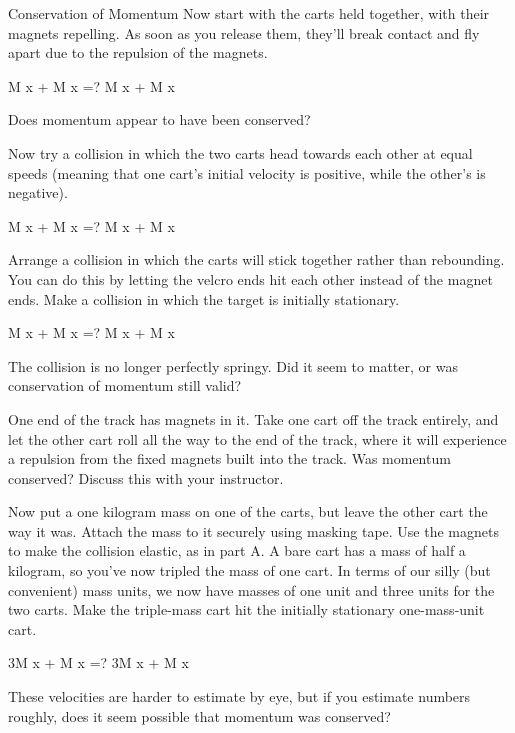 \begin{lab}{Conservation of Momentum}
Now start with the carts held together, with their magnets repelling. As soon as you release them, they'll break contact and fly apart due to the repulsion of the magnets.

        M x \fillinblank + M x \fillinblank =? M x \fillinblank + M x \fillinblank   

Does momentum appear to have been conserved?

Now try a collision in which the two carts head towards each other at equal speeds (meaning that one cart's initial velocity is positive, while the other's is negative).

        M x \fillinblank + M x \fillinblank =? M x \fillinblank + M x \fillinblank   

Arrange a collision in which the carts will stick together rather than rebounding. You can do this by letting the velcro ends hit each other instead of the magnet ends. Make a collision in which the target is initially stationary.

         M x \fillinblank + M x \fillinblank =? M x \fillinblank + M x \fillinblank   

The collision is no longer perfectly springy. Did it seem to matter, or was conservation of momentum still valid?

One end of the track has magnets in it. Take one cart off the track entirely, and let the other cart roll all the way to the end of the track, where it will experience a repulsion from the fixed magnets built into the track. Was momentum conserved? Discuss this with your instructor.

Now put a one kilogram mass on one of the carts, but leave the other cart the way it was.
Attach the mass to it securely using masking tape. 
Use the magnets to make the collision elastic, as in part A.
A bare cart has a mass of half a kilogram, so you've now tripled the mass of one cart. In terms of our silly (but convenient) mass units, we now have masses of one unit and three units for the two carts. Make the triple-mass cart hit the initially stationary one-mass-unit cart.

        3M x \fillinblank + M x \fillinblank =? 3M x \fillinblank + M x \fillinblank   

These velocities are harder to estimate by eye, but if you estimate numbers roughly, does it seem possible that momentum was conserved?


\end{lab}
